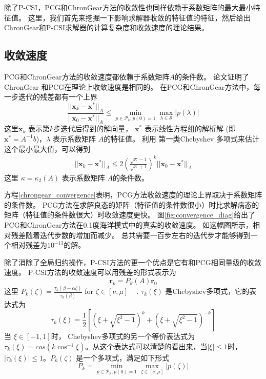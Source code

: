 除了P-CSI，PCG和ChronGear方法的收敛性也同样依赖于系数矩阵的最大最小特征值。
这里，我们首先来挖掘一下影响求解器收敛的特征值的特征，然后给出ChronGear和P-CSI求解器的计算复杂度和收敛速度的理论结果。 


 



\subsection{收敛速度} \label{solver:Algorithm:convergence_rate}

 PCG和ChronGear方法的收敛速度都依赖于系数矩阵$A$的条件数。  
论文证明了 ChronGear  和PCG在理论上收敛速度是相同的。 
在PCG和ChronGear方法中，每一步迭代的残差都有一个上界\cite{Liesen2004}
\begin{equation}
\frac{||\textbf{x}_k-\textbf{x}^*||_A }{||\textbf{x}_0-\textbf{x}^*||_A}  \le \min_{p\in \mathcal{P}_k, p(0) = 1 }\max_{\lambda \in \mathcal{S}} |p(\lambda)| \label{PcgConvergeRate}
\end{equation}
这里$\textbf{x}_k$ 表示第$k$步迭代后得到的解向量， $\textbf{x}^*$ 表示线性方程组的解析解  (即$\textbf{x}^* = A^{-1}b$)，$\lambda$ 表示系数矩阵 $A$的特征值。
利用 第一类Chebyshev 多项式来估计这个最小最大值，可以得到 
\begin{align}
\label{chrongear_convergence}
||\textbf{x}_k-\textbf{x}^*||_A \le  2 (\frac{\sqrt{\kappa}-1}{\sqrt{\kappa}+1})^k ||\textbf{x}_0-\textbf{x}^*||_A
\end{align}
这里  $\kappa =  \kappa_2(A)$ 表示系数矩阵 $A$的条件数。


方程\ref{chrongear_convergence}表明，PCG方法收敛速度的理论上界取决于系数矩阵的条件数。 
PCG方法在求解良态的矩阵（特征值的条件数很小）时比求解病态的矩阵（特征值的条件数很大）时收敛速度更快。 
图\ref{fig:convergence_diag}给出了PCG和ChronGear方法在0.1度海洋模式中的真实的收敛速度。
如这幅图所示，相对残差随着迭代步数的增加而减少。
总共需要一百步左右的迭代步才能够得到一个相对残差为$10^{-13}$的解。
 

 
除了消除了全局归约操作，P-CSI方法的更一个优点是它有和PCG相同量级的收敛速度。 
P-CSI方法的收敛速度可以用残差的形式表示为
\begin{equation}
\textbf{r}_k = P_k(A)\textbf{r}_0 \label{eq:rPjr0}
\end{equation}
这里
$P_k(\zeta) = \frac{\tau_k(\beta-\alpha \zeta)}{\tau_k(\beta)}$ for $ \zeta \in [\nu, \mu]$ ~\cite{stiefel1958kernel} .
$\tau_k(\xi)$ 是Chebyshev多项式，它的表达式为  
\begin{equation}
\tau_k(\xi) =   \frac{1}{2}[(\xi+\sqrt{\xi^2-1})^k+(\xi+\sqrt{\xi^2-1})^{-k}]
\end{equation}
当 $ \xi \in [-1,1]$时， Chebyshev多项式的另一个等价表达式为$\tau_k(\xi) = cos(k\cos^{-1} \xi)$。从这个表达式可以清楚的看出来，当$| \xi | \le 1$时， $|\tau_k(\xi)| \le 1$。$P_k(\zeta)$ 是一个多项式，满足如下形式
\begin{equation}
P_k = \min_{p\in \mathcal{P}_k, p(0) = 1 }\max_{\zeta \in [\nu,\mu]} |p(\zeta)|
\end{equation}

